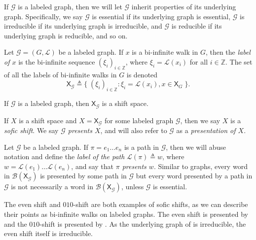 \documentclass[hidelinks]{report}
\newcommand{\Lc}{\mathcal{L}}  %
\newcommand{\Gc}{\mathcal{G}}  %
\newcommand{\Bc}{\mathcal{B}}
\newcommand{\shift}[1]{\mathsf{X}_{#1}}
\newcommand{\term}[1]{\textit{#1}}
\theoremstyle{definition}
\begin{document}
If \(\Gc\) is a labeled graph, then we will let \(\Gc\) inherit properties of its underlying 
graph. Specifically, we say \(\Gc\) is essential if its underlying graph is essential, 
\(\Gc\) is irreducible if its underlying graph is irreducible, and \(\Gc\) is reducible 
if its underlying graph is reducible, and so on. 

\begin{definition}
    Let \(\Gc = (G, \Lc)\) be a labeled graph. If \(x\) is a bi-infinite walk in \(G\), 
    then the \term{label of \(x\)} is the bi-infinite sequence \((\xi_i)_{i \in \mathbb{Z}}\), 
    where \(\xi_i = \Lc(x_i)\) for all \(i \in \mathbb{Z}\). The set of all the labels of 
    bi-infinite walks in \(G\) is denoted
    \[\shift{\Gc} \triangleq \big\{ \; (\xi_i)_{i \in \mathbb{Z}} : \xi_i = \Lc(x_i), x \in \shift{G} \; \big\}.  \]
\end{definition}

\begin{theorem}[name=\cite{lind1995introduction}]
    If \(\Gc\) is a labeled graph, then \(\shift{\Gc}\) is a shift space.
\end{theorem}

If \(X\) is a shift space and \(X = \shift{\Gc}\) for some labeled graph \(\Gc\), 
then we say \(X\) is a \term{sofic shift}. We say \term{\(\Gc\) presents \(X\)}, 
and will also refer to \(\Gc\) as a \term{presentation of \(X\)}. 

Let \(\Gc\) be a labeled graph. 
If \(\pi = e_1 \dots e_n\) is a path in \(\Gc\), then we will abuse notation and 
define the \term{label of the path} \(\Lc(\pi) \triangleq w\),
where \(w = \Lc(e_1) \dots \Lc(e_n)\), and say that \term{\(\pi\)
presents \(w\)}. 
Similar to graphs, every word in \(\Bc(\shift{\Gc})\) is
presented by some path in \(\Gc\) but every word presented by a path in \(\Gc\) is 
not necessarily a word in \(\Bc(\shift{\Gc})\), unless \(\Gc\) is essential.

\begin{example}
    The even shift and \(010\)-shift are both examples of sofic shifts, as we 
    can describe their points as bi-infinite walks on labeled graphs. The even 
    shift is presented by  and the \(010\)-shift is presented by .
    As the underlying graph of  is irreducible, the even shift 
    itself is irreducible.
\end{example}
\end{document}
